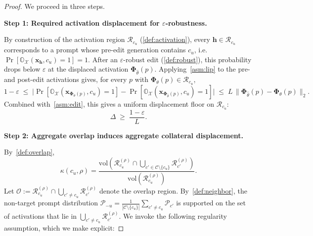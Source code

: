 \begin{proof}
We proceed in three steps.

\medskip
\noindent\textbf{Step 1: Required activation displacement for $\varepsilon$-robustness.}

By construction of the activation region $\mathcal{R}_{c_u}$ (\cref{def:activation}), every $\mathbf{h}\in\mathcal{R}_{c_u}$ corresponds to a prompt whose pre-edit generation contains $c_u$, i.e.\ $\Pr[\mathbb{O}_{\mathcal{X}}(\mathbf{x}_\mathbf{h},c_u)=1]=1$. After an $\varepsilon$-robust edit (\cref{def:robust}), this probability drops below $\varepsilon$ at the displaced activation $\boldsymbol{\Phi}_{\hat\theta}(p)$. Applying~\cref{asm:lip} to the pre- and post-edit activations gives, for every $p$ with $\boldsymbol{\Phi}_\theta(p)\in\mathcal{R}_{c_u}$,
\begin{equation}
    1 - \varepsilon \;\le\; \bigl|\Pr[\mathbb{O}_{\mathcal{X}}(\mathbf{x}_{\boldsymbol{\Phi}_\theta(p)},c_u)=1] - \Pr[\mathbb{O}_{\mathcal{X}}(\mathbf{x}_{\boldsymbol{\Phi}_{\hat\theta}(p)},c_u)=1]\bigr|
    \;\le\; L\,\|\boldsymbol{\Phi}_{\hat\theta}(p)-\boldsymbol{\Phi}_\theta(p)\|_2.
\end{equation}
Combined with~\cref{asm:edit}, this gives a uniform displacement floor on $\mathcal{R}_{c_u}$:
\begin{equation}
\label{eq:proof_delta_floor}
    \Delta \;\geq\; \frac{1-\varepsilon}{L}.
\end{equation}

\medskip
\noindent\textbf{Step 2: Aggregate overlap induces aggregate collateral displacement.}

By~\cref{def:overlap},
\begin{equation}
    \kappa(c_u,\rho)
    =
    \frac{
        \mathrm{vol}\!\left(
        \mathcal{R}_{c_u}^{(\rho)}
        \cap
        \bigcup_{c'\in\mathcal{C}\setminus\{c_u\}}
        \mathcal{R}_{c'}^{(\rho)}
        \right)
    }{
        \mathrm{vol}\!\left(
        \mathcal{R}_{c_u}^{(\rho)}
        \right)
    } .
\end{equation}
Let $\mathcal{O} := \mathcal{R}_{c_u}^{(\rho)} \cap \bigcup_{c'\neq c_u}\mathcal{R}_{c'}^{(\rho)}$ denote the overlap region. By~\cref{def:neighbor}, the non-target prompt distribution $\mathcal{P}_{-u} = \tfrac{1}{|\mathcal{C}\setminus\{c_u\}|}\sum_{c'\neq c_u}\mathcal{P}_{c'}$ is supported on the set of activations that lie in $\bigcup_{c'\neq c_u}\mathcal{R}_{c'}^{(\rho)}$. We invoke the following regularity assumption, which we make explicit:


\end{proof}
